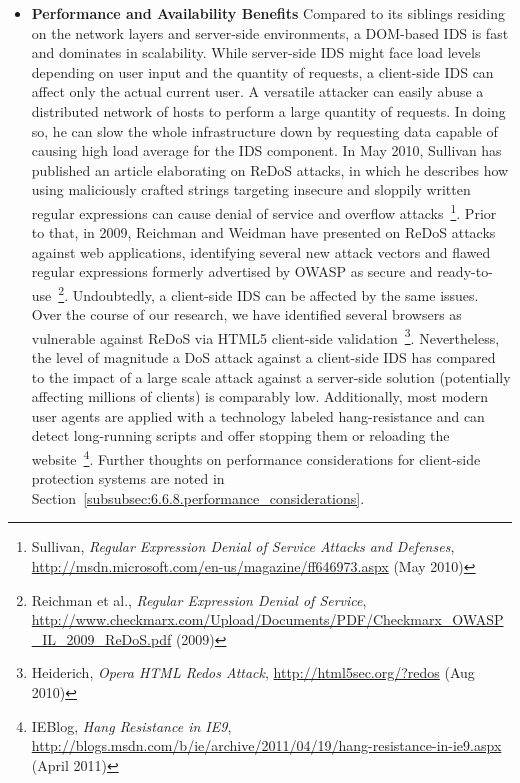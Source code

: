 \begin{itemize}
	\item \textbf{Performance and Availability Benefits} Compared to its siblings residing on the network layers and server-side environments, a DOM-based IDS is fast and dominates in scalability. While server-side IDS might face load levels depending on user input and the quantity of requests, a client-side IDS can affect only the actual current user. A versatile attacker can easily abuse a distributed network of hosts to perform a large quantity of requests. In doing so, he can slow the whole infrastructure down by requesting data capable of causing high load average for the IDS component. In May 2010, Sullivan has published an article elaborating on ReDoS attacks, in which he describes how using maliciously crafted strings targeting insecure and sloppily written regular expressions can cause denial of service and overflow attacks~\footnote{Sullivan, \textit{Regular Expression Denial of Service Attacks and Defenses}, \url{http://msdn.microsoft.com/en-us/magazine/ff646973.aspx} (May 2010)}. Prior to that, in 2009, Reichman and Weidman have presented on ReDoS attacks against web applications, identifying several new attack vectors and flawed regular expressions formerly advertised by OWASP as secure and ready-to-use~\footnote{Reichman et al., \textit{Regular Expression Denial of Service}, \url{http://www.checkmarx.com/Upload/Documents/PDF/Checkmarx_OWASP_IL_2009_ReDoS.pdf} (2009)}. Undoubtedly, a client-side IDS can be affected by the same issues. Over the course of our research, we have identified several browsers as vulnerable against ReDoS via HTML5 client-side validation~\footnote{Heiderich, \textit{Opera HTML Redos Attack}, \url{http://html5sec.org/?redos} (Aug 2010)}. Nevertheless, the level of magnitude a DoS attack against a client-side IDS has compared to the impact of a large scale attack against a server-side solution (potentially affecting millions of clients) is comparably low. Additionally, most modern user agents are applied with a technology labeled hang-resistance and can detect long-running scripts and offer stopping them or reloading the website~\footnote{IEBlog, \textit{Hang Resistance in IE9}, \url{http://blogs.msdn.com/b/ie/archive/2011/04/19/hang-resistance-in-ie9.aspx} (April 2011)}. Further thoughts on performance considerations for client-side protection systems are noted in Section~\ref{subsubsec:6.6.8.performance_considerations}.

\end{itemize}
